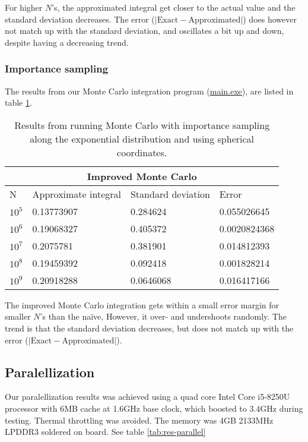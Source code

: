 \documentclass[../main.tex]{subfiles}
\begin{document}
For higher $N$'s, the approximated integral get closer to the actual value and the standard deviation decreases. The error ($|\text{Exact}-\text{Approximated}|$) does however not match up with the standard deviation, and oscillates a bit up and down, despite having a decreasing trend.

\subsubsection{Importance sampling}
The results from our Monte Carlo integration program (\href{https://github.com/kmaasrud/Project-3/blob/master/code/Monte-Carlo/main.exe}{main.exe}), are listed in table \ref{tab:res-impsamp}.

\begin{table}[h!]
  \begin{center}
    \begin{tabular}{|p{1cm}|p{3.5cm}|p{3cm}|p{3cm}|}
      \hline
      \multicolumn{4}{|c|}{\textbf{Improved Monte Carlo}} \\
      \hline
      N   & Approximate integral & Standard deviation & Error\\
      \hline
      $10^5$ &  0.13773907 &  0.284624 & 0.055026645\\
      $10^6$ &  0.19068327 &  0.405372 & 0.0020824368\\
      $10^7$ &  0.2075781 &  0.381901  & 0.014812393\\
      $10^8$ &  0.19459392 &  0.092418  & 0.001828214\\
      $10^9$ &  0.20918288 &  0.0646068 & 0.016417166\\
      \hline
    \end{tabular}
    \caption{Results from running Monte Carlo with importance sampling along the exponential distribution and using spherical coordinates.}
    \label{tab:res-impsamp}
  \end{center}
\end{table}
\FloatBarrier
The improved Monte Carlo integration gets within a small error margin for smaller $N$'s than the naïve, However, it over- and undershoots randomly. The trend is that the standard deviation decreases, but does not match up with the error ($|\text{Exact}-\text{Approximated}|$).

\subsection{Paralellization} \label{sec:res-paralell}
Our paralellization results was achieved using a quad core Intel Core i5-8250U processor with 6MB cache at 1.6GHz base clock, which boosted to 3.4GHz during testing. Thermal throttling was avoided.
The memory was 4GB 2133MHz LPDDR3 soldered on board. See table \ref{tab:res-parallel}
\end{document}
